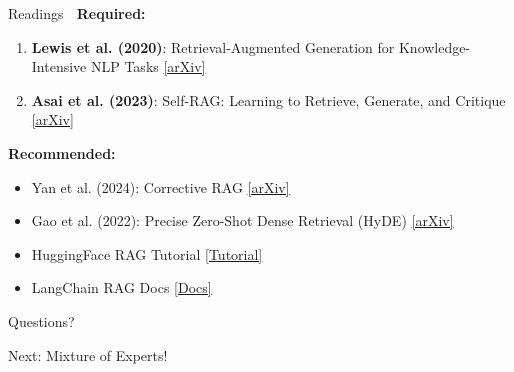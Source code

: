 \documentclass[aspectratio=169]{beamer}
\begin{document}
\begin{frame}[shrink=10]{Readings 📖}
\textbf{Required:}
\begin{enumerate}\setlength{\itemsep}{0pt}
    \item \textbf{Lewis et al. (2020)}: Retrieval-Augmented Generation for Knowledge-Intensive NLP Tasks
    \href{https://arxiv.org/abs/2005.11401}{[arXiv]}

    \item \textbf{Asai et al. (2023)}: Self-RAG: Learning to Retrieve, Generate, and Critique
    \href{https://arxiv.org/abs/2310.11511}{[arXiv]}
\end{enumerate}

\vspace{0.5em}

\textbf{Recommended:}
\begin{itemize}\setlength{\itemsep}{0pt}
    \item Yan et al. (2024): Corrective RAG \href{https://arxiv.org/abs/2401.15884}{[arXiv]}
    \item Gao et al. (2022): Precise Zero-Shot Dense Retrieval (HyDE) \href{https://arxiv.org/abs/2212.10496}{[arXiv]}
    \item HuggingFace RAG Tutorial \href{https://huggingface.co/learn/cookbook/advanced_rag}{[Tutorial]}
    \item LangChain RAG Docs \href{https://python.langchain.com/docs/use_cases/question_answering/}{[Docs]}
\end{itemize}
\end{frame}

\begin{frame}
\begin{center}
\Huge{Questions? 💬}

\vspace{2cm}

\Large{Next: Mixture of Experts!}
\end{center}
\end{frame}
\end{document}
